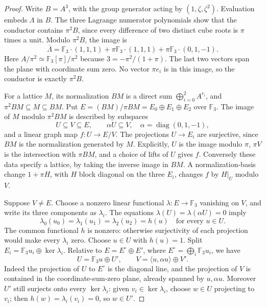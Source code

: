 \begin{proof}
Write $B=A^3$, with the group generator acting by
$(1,\zeta,\zeta^2)$. Evaluation embeds $\Lambda$ in $B$.
The three Lagrange numerator polynomials show that the conductor
contains $\pi^2B$, since every difference of two distinct cube
roots is $\pi$ times a unit. Modulo $\pi^2B$, the image is
\[
 \overline\Lambda
 =\mathbb F_3\cdot(1,1,1)
   +\pi\mathbb F_3\cdot(1,1,1)
   +\pi\mathbb F_3\cdot(0,1,-1).
                                                        \tag{C.1.31}
\]
Here $A/\pi^2\simeq\mathbb F_3[\pi]/\pi^2$ because
$3=-\pi^2/(1+\pi)$. The last two vectors span the plane with
coordinate sum zero. No vector $\pi e_i$ is in this image, so
the conductor is exactly $\pi^2B$.

For a lattice $M$, its normalization $BM$ is a direct sum
$\bigoplus_{i=0}^2 A^{r_i}$, and
$\pi^2BM\subseteq M\subseteq BM$. Put
$E=(BM)/\pi BM=E_0\oplus E_1\oplus E_2$ over $\mathbb F_3$.
The image of $M$ modulo $\pi^2BM$ is described by subspaces
\[
 U\subseteq V\subseteq E,\qquad \alpha U\subseteq V,
 \quad \alpha=\operatorname{diag}(0,1,-1),
\]
and a linear graph map $f:U\to E/V$.
The projections $U\to E_i$ are surjective, since $BM$ is the
normalization generated by $M$. Explicitly, $U$ is the image
modulo $\pi$, $\pi V$ is the intersection with $\pi BM$, and a
choice of lifts of $U$ gives $f$. Conversely these data specify
a lattice, by taking the inverse image in $BM$.
A normalization-basis change $1+\pi H$, with $H$ block diagonal
on the three $E_i$, changes $f$ by $H|_U$ modulo $V$.

Suppose $V\ne E$. Choose a nonzero linear functional
$\lambda:E\to\mathbb F_3$ vanishing on $V$, and write its three
components as $\lambda_i$. The equations
$\lambda(U)=\lambda(\alpha U)=0$ imply
\[
 \lambda_0(u_0)=\lambda_1(u_1)=\lambda_2(u_2)=h(u)
 \quad\text{for every }u\in U.
\]
The common functional $h$ is nonzero: otherwise surjectivity of
each projection would make every $\lambda_i$ zero.
Choose $u\in U$ with $h(u)=1$. Split
$E_i=\mathbb F_3u_i\oplus\ker\lambda_i$.
Relative to $E=E^{\circ}\oplus E'$, where
$E^{\circ}=\bigoplus_i\mathbb F_3u_i$, we have
\[
 U=\mathbb F_3u\oplus U',\qquad
 V=\langle u,\alpha u\rangle\oplus V'.
\]
Indeed the projection of $U$ to $E^{\circ}$ is the diagonal line,
and the projection of $V$ is contained in the coordinate-sum-zero
plane, already spanned by $u,\alpha u$.
Moreover $U'$ still surjects onto every $\ker\lambda_i$:
given $v_i\in\ker\lambda_i$, choose $w\in U$ projecting to
$v_i$; then $h(w)=\lambda_i(v_i)=0$, so $w\in U'$.


\end{proof}
